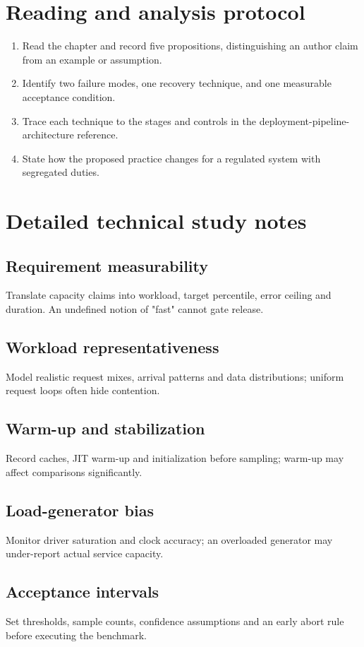 \documentclass[10pt,letterpaper]{article}
\begin{document}
\section{Reading and analysis protocol}
\begin{enumerate}
\item Read the chapter and record five propositions, distinguishing an author claim from an example or assumption.
\item Identify two failure modes, one recovery technique, and one measurable acceptance condition.
\item Trace each technique to the stages and controls in the deployment-pipeline-architecture reference.
\item State how the proposed practice changes for a regulated system with segregated duties.
\end{enumerate}

\section{Detailed technical study notes}
\subsection{Requirement measurability}
Translate capacity claims into workload, target percentile, error ceiling and duration. An undefined notion of "fast" cannot gate release.

\subsection{Workload representativeness}
Model realistic request mixes, arrival patterns and data distributions; uniform request loops often hide contention.

\subsection{Warm-up and stabilization}
Record caches, JIT warm-up and initialization before sampling; warm-up may affect comparisons significantly.

\subsection{Load-generator bias}
Monitor driver saturation and clock accuracy; an overloaded generator may under-report actual service capacity.

\subsection{Acceptance intervals}
Set thresholds, sample counts, confidence assumptions and an early abort rule before executing the benchmark.
\end{document}

